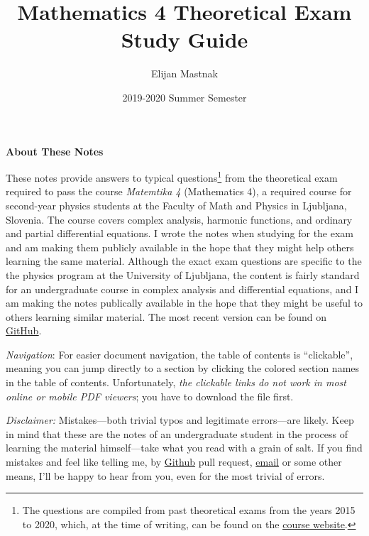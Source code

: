 \documentclass[11pt, a4paper]{article}
\begin{document}
\title{Mathematics 4 Theoretical Exam Study Guide}
\author{Elijan Mastnak}
\date{2019-2020 Summer Semester}
\maketitle

\begin{center}
\textbf{About These Notes}
\end{center}
These notes provide answers to typical questions\footnote{The questions are compiled from past theoretical exams from the years 2015 to 2020, which, at the time of writing, can be found on the \href{https://www.fmf.uni-lj.si/~magajna/Matematika4FIZ/osnovna.htm}{\underline{course website}}.} from the theoretical exam required to pass the course \textit{Matemtika 4} (Mathematics 4), a required course for second-year physics students at the Faculty of Math and Physics in Ljubljana, Slovenia. The course covers complex analysis, harmonic functions, and ordinary and partial differential equations. I wrote the notes when studying for the exam and am making them publicly available in the hope that they might help others learning the same material. Although the exact exam questions are specific to the the physics program at the University of Ljubljana, the content is fairly standard for an undergraduate course in complex analysis and differential equations, and I am making the notes publically available in the hope that they might be useful to others learning similar material. The most recent version can be found on \href{https://github.com/ejmastnak/fmf/tree/main/math-4}{\underline{GitHub}}.


\vspace{2mm}
\textit{Navigation}: For easier document navigation, the table of contents is ``clickable'', meaning you can jump directly to a section by clicking the colored section names in the table of contents. Unfortunately, \textit{the clickable links do not work in most online or mobile PDF viewers}; you have to download the file first.


\vspace{2mm}
\textit{Disclaimer:} Mistakes---both trivial typos and legitimate errors---are likely. Keep in mind that these are the notes of an undergraduate student in the process of learning the material himself---take what you read with a grain of salt. If you find mistakes and feel like telling me, by \href{https://github.com/ejmastnak/fmf}{Github} pull request, \href{mailto:ejmastnak@gmail.com}{email} or some other means, I'll be happy to hear from you, even for the most trivial of errors.
\end{document}
